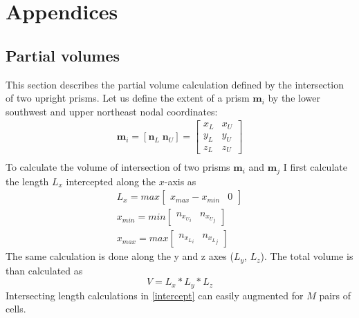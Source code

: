 \chapter{Appendices}

\section{Partial volumes}\label{AppendixA}

This section describes the partial volume calculation defined by the intersection of two upright prisms.
Let us define the extent of a prism $\mathbf{m}_i$ by the lower southwest and upper northeast nodal coordinates:
\begin{equation}
\begin{split}
\mathbf{m}_i = [\mathbf{n}_L\; \mathbf{n}_U] = \begin{bmatrix} x_{L} & x_{U} \\ y_{L}& y_{U} \\ z_{L} & z_{U} \end{bmatrix}\\
\end{split}
\end{equation}
To calculate the volume of intersection of two prisms $\mathbf{m}_i$ and $\mathbf{m}_j$ I first calculate the length $L_x$ intercepted along the $x$-axis as 
\begin{equation}\label{intercept}
\begin{split} 
L_x = max\begin{bmatrix} x_{max} - x_{min} & 0\end{bmatrix}\\
x_{min} = min\begin{bmatrix} n_{{x_U}_i} & n_{{x_U}_j} \end{bmatrix}\\
x_{max} = max\begin{bmatrix} n_{{x_L}_i} & n_{{x_L}_j} \end{bmatrix} 
\end{split}
\end{equation}
The same calculation is done along the y and z axes ($L_y$, $L_z$).
The total volume is than calculated as
\begin{equation}
V = L_x* L_y * L_z
\end{equation}
Intersecting length calculations in \eqref{intercept} can easily augmented for $M$ pairs of cells.